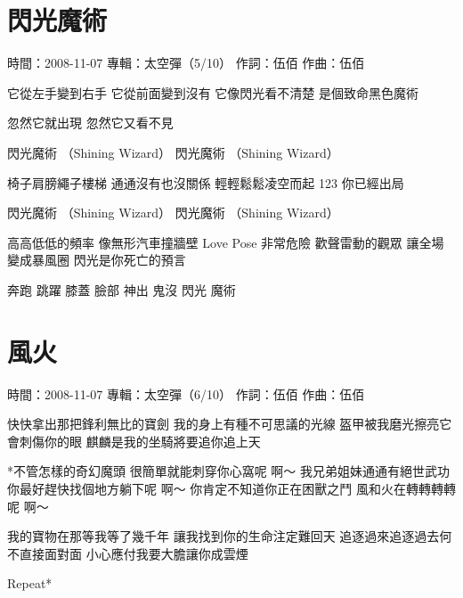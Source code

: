 \documentclass[UTF8,a4paper,oneside,twocolumn,12pt]{ctexbook}
\newcommand{\infopair}[2]{\textbullet #1：#2}
\newcommand{\zc}[1][伍佰]{\infopair{作詞}{#1}}
\newcommand{\zq}[1][伍佰]{\infopair{作曲}{#1}}
\newcommand{\zj}[1]{\infopair{專輯}{#1}}
\newcommand{\sj}[1]{\infopair{時間}{#1}}
\newenvironment{info}{\begin{flushleft}\kaishu
	}
	{\end{flushleft}\normalsize\yahei\par}
\newenvironment{lyric}{
	}
{}
\begin{document}
\section{閃光魔術}
\begin{info}
	\sj{2008-11-07}
	\zj{太空彈（5/10）}
	\zc
	\zq
\end{info}
\begin{lyric}
	它從左手變到右手
	它從前面變到沒有
	它像閃光看不清楚
	是個致命黑色魔術

	忽然它就出現
	忽然它又看不見

	閃光魔術 （Shining Wizard）
	閃光魔術 （Shining Wizard）

	椅子肩膀繩子樓梯
	通通沒有也沒關係
	輕輕鬆鬆凌空而起
	123 你已經出局

	閃光魔術 （Shining Wizard）
	閃光魔術 （Shining Wizard）

	高高低低的頻率 像無形汽車撞牆壁
	Love Pose 非常危險
	歡聲雷動的觀眾 讓全場變成暴風圈
	閃光是你死亡的預言

	奔跑 跳躍 膝蓋 臉部
	神出 鬼沒 閃光 魔術
\end{lyric}

\section{風火}
\begin{info}
	\sj{2008-11-07}
	\zj{太空彈（6/10）}
	\zc
	\zq
\end{info}
\begin{lyric}
	快快拿出那把鋒利無比的寶劍
	我的身上有種不可思議的光線
	盔甲被我磨光擦亮它會刺傷你的眼
	麒麟是我的坐騎將要追你追上天

	*不管怎樣的奇幻魔頭
	很簡單就能刺穿你心窩呢 啊～
	我兄弟姐妹通通有絕世武功
	你最好趕快找個地方躺下呢 啊～
	你肯定不知道你正在困獸之鬥
	風和火在轉轉轉轉呢 啊～

	我的寶物在那等我等了幾千年
	讓我找到你的生命注定難回天
	追逐過來追逐過去何不直接面對面
	小心應付我要大膽讓你成雲煙

	Repeat*
\end{lyric}
\end{document}
